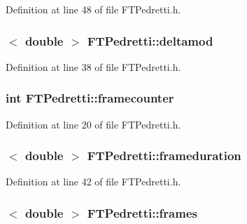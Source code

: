 Definition at line 48 of file FTPedretti.h.

\hypertarget{classFTPedretti_a576b58f03f27f35cdf75aa1e988b2982}{
\subsubsection[{deltamod}]{$<$ double $>$ {\bf FTPedretti::deltamod}}}
\label{classFTPedretti_a576b58f03f27f35cdf75aa1e988b2982}


Definition at line 38 of file FTPedretti.h.

\hypertarget{classFTPedretti_a6aab8bf34752e2003fd24429b5deabf0}{
\subsubsection[{framecounter}]{\setlength{\rightskip}{0pt plus 5cm}int {\bf FTPedretti::framecounter}}}
\label{classFTPedretti_a6aab8bf34752e2003fd24429b5deabf0}


Definition at line 20 of file FTPedretti.h.

\hypertarget{classFTPedretti_a760d972f67ceec4fbfb8defb7b44db8e}{
\subsubsection[{frameduration}]{$<$ double $>$ {\bf FTPedretti::frameduration}}}
\label{classFTPedretti_a760d972f67ceec4fbfb8defb7b44db8e}


Definition at line 42 of file FTPedretti.h.

\hypertarget{classFTPedretti_ae3c6c05c945c59fb8b3df83876faeab2}{
\subsubsection[{frames}]{$<$ double $>$ {\bf FTPedretti::frames}}}
\label{classFTPedretti_ae3c6c05c945c59fb8b3df83876faeab2}


